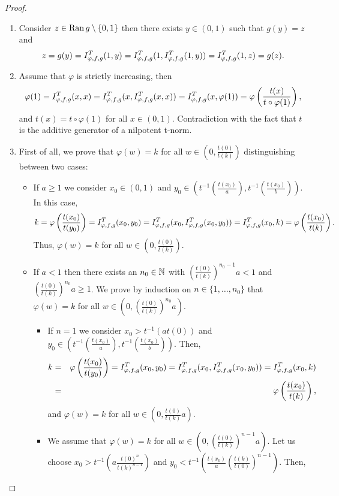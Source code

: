 \begin{proof}
\begin{enumerate}[label=(\roman*)]
	\item Consider $z \in \operatorname{Ran} g \setminus \{0,1\}$ then there exists $y \in (0,1)$ such that $g(y)=z$ and
	$$z=g(y)=I^T_{\varphi,f,g}(1,y)=I^T_{\varphi,f,g}(1,I^T_{\varphi,f,g}(1,y))=I^T_{\varphi,f,g}(1,z)=g(z).$$
	\item Assume that $\varphi$ is strictly increasing, then
	$$\varphi(1)=I^T_{\varphi,f,g}(x,x)=I^T_{\varphi,f,g}(x,I^T_{\varphi,f,g}(x,x)) =I^T_{\varphi,f,g}(x,\varphi(1)) = \varphi \left(\frac{t(x)}{t \circ \varphi(1)}\right),$$
	and $t(x)=t \circ \varphi(1)$ for all $x \in (0,1)$. Contradiction with the fact that $t$ is the additive generator of a nilpotent t-norm.
	\item First of all, we prove that $\varphi(w)=k$ for all $w \in \left(0,\frac{t(0)}{t(k)}\right)$ distinguishing between two cases:
	\begin{itemize}
		\item If $a \geq 1$ we consider $x_0 \in (0,1)$ and $y_0 \in \left( t^{-1} \left(\frac{t(x_0)}{a}\right), t^{-1} \left(\frac{t(x_0)}{b}\right)\right)$. In this case,
		$$k = \varphi \left(\frac{t(x_0)}{t(y_0)}\right) = I^T_{\varphi,f,g}(x_0,y_0) = I^T_{\varphi,f,g}(x_0,I^T_{\varphi,f,g}(x_0,y_0)) = I^T_{\varphi,f,g}(x_0,k) = \varphi \left(\frac{t(x_0)}{t(k)}\right).$$
		Thus, $\varphi(w)=k$ for all $w \in \left(0,\frac{t(0)}{t(k)}\right)$.
		\item If $a < 1$ then there exists an $n_0 \in \mathbb{N}$ with $\left( \frac{t(0)}{t(k)} \right)^{n_0-1}a<1$ and $\left( \frac{t(0)}{t(k)} \right)^{n_0}a \geq 1$. We prove by induction on $n \in \{1,\dots,n_0\}$ that $\varphi(w)=k$ for all $w \in \left(0,\left(\frac{t(0)}{t(k)}\right)^{n_0}a\right)$.
		\begin{itemize}
			\item If $n=1$ we consider $x_0 > t^{-1}(a t(0))$ and $y_0 \in \left( t^{-1} \left(\frac{t(x_0)}{a}\right), t^{-1} \left(\frac{t(x_0)}{b}\right)\right)$. Then,
			\begin{eqnarray*}
			k &=& \varphi \left(\frac{t(x_0)}{t(y_0)}\right) = I^T_{\varphi,f,g}(x_0,y_0) = I^T_{\varphi,f,g}(x_0,I^T_{\varphi,f,g}(x_0,y_0))= I^T_{\varphi,f,g}(x_0,k) \\
			&=& \varphi \left(\frac{t(x_0)}{t(k)}\right),
			\end{eqnarray*}
			and $\varphi(w)=k$ for all $w \in \left(0,\frac{t(0)}{t(k)}a\right)$.
			\item We assume that $\varphi(w)=k$ for all $w \in \left(0,\left(\frac{t(0)}{t(k)}\right)^{n-1}a\right)$. Let us choose $x_0 > t^{-1} \left(a \frac{t(0)^n}{t(k)^{n-1}}\right)$ and $y_0 < t^{-1} \left(\frac{t(x_0)}{a} \left(\frac{t(k)}{t(0)}\right)^{n-1}\right)$. Then,

\end{itemize}
\end{itemize}
\end{enumerate}
\end{proof}
